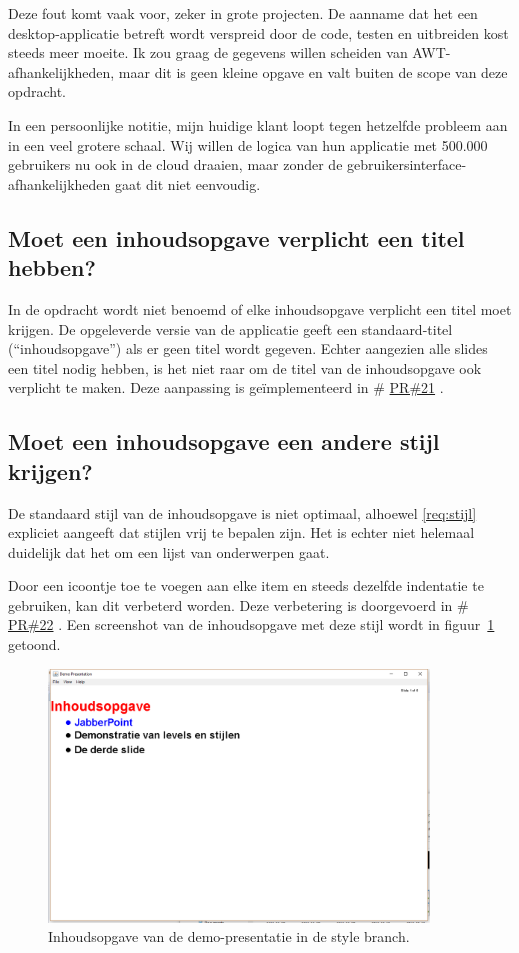 \documentclass[a4paper]{article}
\makeatletter
\newcommand*{\repo}{\begingroup\@makeother\#\@repo}
\newcommand*{\@repo}[2]{%
  \href{https://github.com/DanielSchiavini/design-patterns-assignment/#1}{#2}%
  \endgroup}
\newcommand{\PR}[1]{\repo{pull/#1}{PR\##1}}
\newcommand{\reqref}[1]{\ref{req:#1}}
\newcommand{\question}[1]{
  \subsection{#1}
}
\makeatother
\begin{document}
    Deze fout komt vaak voor, zeker in grote projecten.
    De aanname dat het een desktop-applicatie betreft wordt verspreid door de code, testen en uitbreiden kost steeds meer moeite.
    Ik zou graag de gegevens willen scheiden van AWT-afhankelijkheden, maar dit is geen kleine opgave en valt buiten de scope van deze opdracht.

    In een persoonlijke notitie, mijn huidige klant loopt tegen hetzelfde pro\-bleem aan in een veel grotere schaal.
    Wij willen de logica van hun applicatie met 500.000 gebruikers nu ook in de cloud draaien, maar zonder de ge\-bruik\-ers\-inter\-face-afhankelijkheden gaat dit niet eenvoudig.

    \question{Moet een inhoudsopgave verplicht een titel hebben?}
    In de opdracht wordt niet benoemd of elke inhoudsopgave verplicht een titel moet krijgen.
    De opgeleverde versie van de applicatie geeft een standaard-titel (``inhoudsopgave'') als er geen titel wordt gegeven.
    Echter aangezien alle slides een titel nodig hebben, is het niet raar om de titel van de inhoudsopgave ook verplicht te maken.
    Deze aanpassing is geïmplementeerd in \PR{21}.
    
    \question{Moet een inhoudsopgave een andere stijl krijgen?}
    De standaard stijl van de inhoudsopgave is niet optimaal, alhoewel \reqref{stijl} expliciet aangeeft dat stijlen vrij te bepalen zijn.
    Het is echter niet helemaal duidelijk dat het om een lijst van onderwerpen gaat.
    
    Door een icoontje toe te voegen aan elke item en steeds dezelfde indentatie te gebruiken, kan dit verbeterd worden.
    Deze verbetering is doorgevoerd in \PR{22}.
    Een screenshot van de inhoudsopgave met deze stijl wordt in figuur~\ref{fig:style} getoond.
    \begin{figure}[!htb]
     \caption{
        Inhoudsopgave van de demo-presentatie in de style branch.\label{fig:style}
     }
     \centering \includegraphics[width=0.9\textwidth]{Screenshots/style.png}
    \end{figure}
\end{document}
